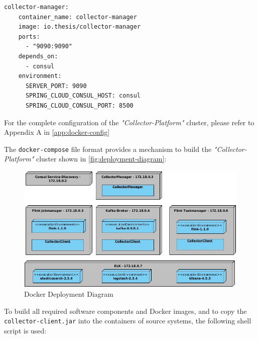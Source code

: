 \begin{lstlisting}[caption={CollectorManager container configuration}, captionpos=b, label={lst:docker-manager}]
  collector-manager:
    container_name: collector-manager
    image: io.thesis/collector-manager
    ports:
      - "9090:9090"
    depends_on:
      - consul
    environment:
      SERVER_PORT: 9090
      SPRING_CLOUD_CONSUL_HOST: consul
      SPRING_CLOUD_CONSUL_PORT: 8500
\end{lstlisting}

For the complete configuration of the \textit{"Collector-Platform"} cluster, please refer to Appendix A in \autoref{app:docker-config}

The \verb|docker-compose| file format provides a mechanism to build the \textit{"Collector-Platform"} cluster shown in
\autoref{fig:deployment-diagram}:

\begin{figure}[H]
	\centering
	\includegraphics[width=1.0\textwidth]{../uml/deployment-diagram.jpg}
	\caption{Docker Deployment Diagram}
	\label{fig:deployment-diagram}
\end{figure}

To build all required software components and Docker images, and to copy the \verb|collector-client.jar| into the containers of source systems,
the following shell script is used:

